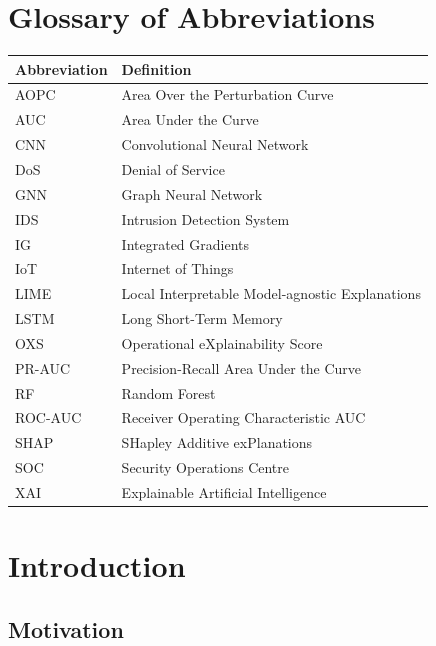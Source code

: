 \documentclass[12pt,a4paper]{report}
\begin{document}
\tableofcontents
\listoftables
\listoffigures

\chapter*{Glossary of Abbreviations}

\begin{longtable}{p{3cm}p{10cm}}
\textbf{Abbreviation} & \textbf{Definition} \\
\midrule
AOPC & Area Over the Perturbation Curve \\
AUC & Area Under the Curve \\
CNN & Convolutional Neural Network \\
DoS & Denial of Service \\
GNN & Graph Neural Network \\
IDS & Intrusion Detection System \\
IG & Integrated Gradients \\
IoT & Internet of Things \\
LIME & Local Interpretable Model-agnostic Explanations \\
LSTM & Long Short-Term Memory \\
OXS & Operational eXplainability Score \\
PR-AUC & Precision-Recall Area Under the Curve \\
RF & Random Forest \\
ROC-AUC & Receiver Operating Characteristic AUC \\
SHAP & SHapley Additive exPlanations \\
SOC & Security Operations Centre \\
XAI & Explainable Artificial Intelligence \\
\end{longtable}

\pagestyle{fancy}
\chapter{Introduction}
\label{ch:introduction}

\section{Motivation}
\label{sec:motivation}
\end{document}
